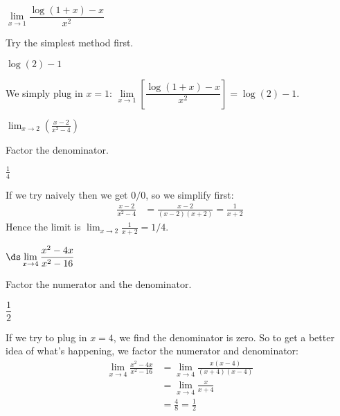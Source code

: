 \begin{question}[2012H]
$\lim\limits_{x\rightarrow 1}\dfrac{\log(1+x)-x}{x^2}$
\end{question}
\begin{hint} Try the simplest method first.
\end{hint}
\begin{answer}
$\log(2)-1$
\end{answer}
\begin{solution}
We simply plug in $x=1$:
$\lim\limits_{x\rightarrow 1}\left[\dfrac{\log(1+x)-x}{x^2}\right]=\log(2)-1$.
\end{solution}



\begin{question}[2015Q]
$\displaystyle\lim_{x\rightarrow 2} \left(\frac{x-2}{x^2-4}\right)$
\end{question}
\begin{hint} Factor the denominator.
\end{hint}
\begin{answer} $\frac{1}{4}$
\end{answer}
\begin{solution}
If we try naively then we get $0/0$, so we simplify first:
\begin{align*}
  \frac{x-2}{x^2-4} &= \frac{x-2}{(x-2)(x+2)} = \frac{1}{x+2}
\end{align*}
Hence the limit is $\displaystyle \lim_{x\rightarrow2} \frac{1}{x+2} = 1/4$.\end{solution}


\begin{Mquestion}[2006H]
 $\ds\lim\limits_{x\rightarrow 4}\dfrac{x^2-4x}{x^2-16}$
\end{Mquestion}
\begin{hint} Factor the numerator and the denominator.
\end{hint}
\begin{answer}
$\dfrac{1}{2}$
\end{answer}
\begin{solution}
If we try to plug in $x=4$, we find the denominator is zero. So to get a better idea of what's happening, we factor the numerator and denominator:
\begin{align*}
\lim\limits_{x\rightarrow 4}\frac{x^2-4x}{x^2-16}
		&=\lim\limits_{x\rightarrow 4}\frac{x(x-4)}{(x+4)(x-4)}\\
                 &=\lim\limits_{x\rightarrow 4}\frac{x}{x+4}\\
                 &=\frac{4}{8}=\frac{1}{2}
                 \end{align*}
\end{solution}


